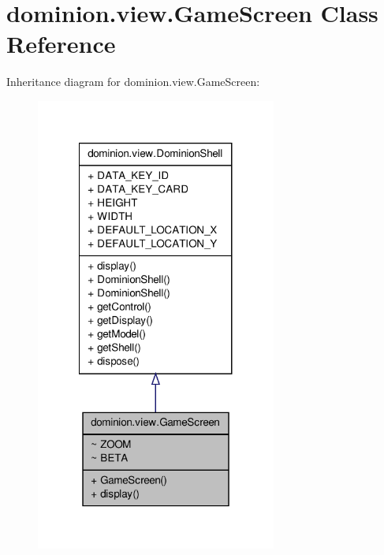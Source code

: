 \hypertarget{classdominion_1_1view_1_1GameScreen}{\section{dominion.\-view.\-Game\-Screen \-Class \-Reference}
\label{classdominion_1_1view_1_1GameScreen}
}


\-Inheritance diagram for dominion.\-view.\-Game\-Screen\-:
\nopagebreak
\begin{figure}[H]
\begin{center}
\leavevmode
\includegraphics[width=224pt]{classdominion_1_1view_1_1GameScreen__inherit__graph}
\end{center}
\end{figure}


